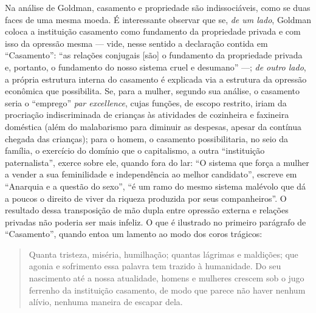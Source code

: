 Na análise de Goldman, casamento e propriedade são indissociáveis, como
se duas faces de uma mesma moeda. É interessante observar que se,
\emph{de um lado}, Goldman coloca a instituição casamento como
fundamento da propriedade privada e com isso da opressão mesma --- vide,
nesse sentido a declaração contida em ``Casamento'': ``as relações
conjugais {[}são{]} o fundamento da propriedade privada e, portanto, o
fundamento do nosso sistema cruel e desumano'' ---; \emph{de outro lado},
a própria estrutura interna do casamento é explicada via a estrutura da
opressão econômica que possibilita. Se, para a mulher, segundo sua
análise, o casamento seria o ``emprego'' \emph{par excellence}, cujas
funções, de escopo restrito, iriam da procriação indiscriminada de
crianças às atividades de cozinheira e faxineira doméstica (além do
malabarismo para diminuir as despesas, apesar da contínua chegada das
crianças); para o homem, o casamento possibilitaria, no seio da família,
o exercício do domínio que o capitalismo, a outra ``instituição
paternalista'', exerce sobre ele, quando fora do lar: ``O sistema que
força a mulher a vender a sua feminilidade e independência ao melhor
candidato'', escreve em ``Anarquia e a questão do sexo'', ``é um ramo do
mesmo sistema malévolo que dá a poucos o direito de viver da riqueza
produzida por seus companheiros''. O resultado dessa transposição de mão
dupla entre opressão externa e relações privadas não poderia ser mais
infeliz. O que é ilustrado no primeiro parágrafo de ``Casamento'',
quando entoa um lamento ao modo dos coros trágicos:

\begin{quote}
Quanta tristeza, miséria, humilhação; quantas lágrimas e maldições; que
agonia e sofrimento essa palavra tem trazido à humanidade. Do seu
nascimento até a nossa atualidade, homens e mulheres crescem sob o jugo
ferrenho da instituição casamento, de modo que parece não haver nenhum
alívio, nenhuma maneira de escapar dela.
\end{quote}

